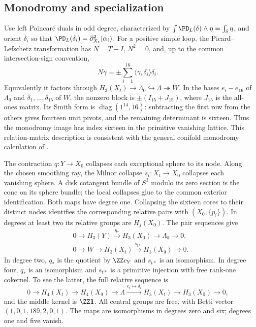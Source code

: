 \subsection{Monodromy and specialization}\label{sec:specialization}
Use left Poincar\'e duals in odd degree, characterized by
$\int\PD_L(\delta)\wedge\eta=\int_\delta\eta$, and orient $\delta_i$
so that $\PD_L(\delta_i)=\partial_{X_t}^2(\alpha_i)$.
For a positive simple loop, the Picard--Lefschetz transformation has
$N=T-I$, $N^2=0$, and, up to the common intersection-sign convention,
\begin{equation}\label{eq:monodromy}
 N\gamma=\pm\sum_{i=1}^{16}\langle\gamma,\delta_i\rangle\delta_i.
\end{equation}
Equivalently it factors through
$H_3(X_t)\to \Lambda_0\hookrightarrow\Lambda\twoheadrightarrow W$.
In the bases $e_i-e_{16}$ of $\Lambda_0$ and $\delta_1,\ldots,\delta_{15}$
of $W$, the nonzero block is $\pm(I_{15}+J_{15})$, where $J_{15}$
is the all-ones matrix. Its Smith form is
$\operatorname{diag}(1^{14},16)$: subtracting the first row from the
others gives fourteen unit pivots, and the remaining determinant is
sixteen. Thus the monodromy image has index sixteen in the primitive
vanishing lattice. This relation-matrix description is consistent with
the general conifold monodromy calculation of \cite{lee-lin-wang}.

The contraction $q:Y\to X_0$ collapses each exceptional sphere to its
node. Along the chosen smoothing ray, the Milnor collapse
$s_t:X_t\to X_0$ collapses each vanishing sphere. A disk cotangent bundle
of $S^3$ modulo its zero section is the cone on its sphere bundle; the
local collapses glue to the common exterior identification. Both maps
have degree one. Collapsing the sixteen cores to their distinct nodes
identifies the corresponding relative pairs with $(X_0,\{p_i\})$.
In degrees at least two its relative groups are $H_j(X_0)$. The pair
sequences give
\begin{equation}\label{eq:central-homology}
 \begin{split}
 &0\to H_3(Y)\xrightarrow{q_*}H_3(X_0)\to \Lambda_0\to0,\\
 &0\to W\to H_3(X_t)\xrightarrow{s_{t*}}H_3(X_0)\to0.
 \end{split}
\end{equation}
In degree two, $q_*$ is the quotient by $\ZZ c_Y$ and $s_{t*}$ is
an isomorphism. In degree four, $q_*$ is an isomorphism and $s_{t*}$
is a primitive injection with free rank-one cokernel. To see the latter,
the full relative sequence is
\[
 0\to H_4(X_t)\to H_4(X_0)\to\Lambda
 \xrightarrow{e_i\mapsto\delta_i}H_3(X_t)\to H_3(X_0)\to0,
\]
and the middle kernel is $\ZZ\mathbf1$. All central groups are free,
with Betti vector $(1,0,1,189,2,0,1)$. The maps are isomorphisms in
degrees zero and six; degrees one and five vanish.

